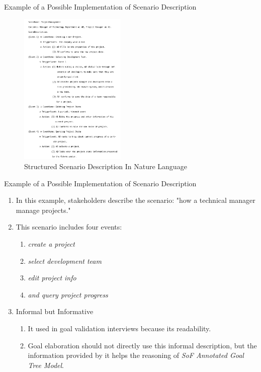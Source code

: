 \documentclass{beamer}
\begin{document}
\begin{frame}{Example of a Possible Implementation of Scenario Description}
  \begin{figure}
    \includegraphics[width=2.0in]{img/3.PNG}
    \caption{Structured Scenario Description In Nature Language}
  \end{figure}
\end{frame}  

\begin{frame}{Example of a Possible Implementation of Scenario Description}
  \begin{enumerate}
  \item
    In this example, stakeholders describe the scenario: "how a technical manager manage projects." 
  \item 
    This scenario includes four events: 
    \begin{enumerate}
    \item \emph{create a project}
    \item \emph{select development team}
    \item \emph{edit project info}
    \item \emph{and query project progress}
    \end{enumerate}
  \item Informal but Informative 
    \begin{enumerate}
    \item It used in goal validation interviews because its readability. 
    \item Goal elaboration should not directly use this informal description, but the information provided by it helps the reasoning of \emph{SoF Annotated Goal Tree Model}.
    \end{enumerate}
  \end{enumerate}
\end{frame}  
\end{document}
